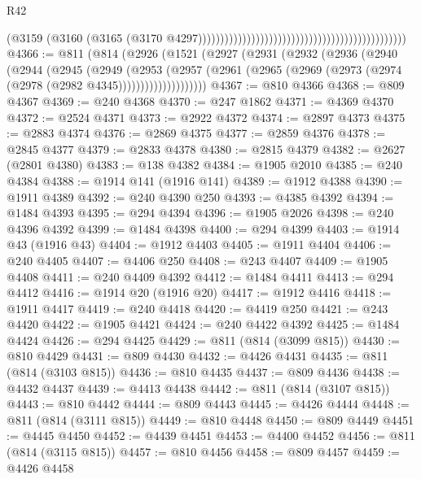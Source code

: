\begin{lexlean}{R42}
\begin{coremodule}
{                                                                                          (@3159
                                                                                            (@3160
                                                                                              (@3165
                                                                                                (@3170
                                                                                                  @4297)))))))))))))))))))))))))))))))))))))))))))))))
@4366 := @811
    (@814
      (@2926
        (@1521
          (@2927
            (@2931
              (@2932
                (@2936
                  (@2940
                    (@2944
                      (@2945
                        (@2949
                          (@2953
                            (@2957
                              (@2961
                                (@2965 (@2969 (@2973 (@2974 (@2978 (@2982 @4345))))))))))))))))))))
@4367 := @810 @4366
@4368 := @809 @4367
@4369 := @240 @4368
@4370 := @247 @1862
@4371 := @4369 @4370
@4372 := @2524 @4371
@4373 := @2922 @4372
@4374 := @2897 @4373
@4375 := @2883 @4374
@4376 := @2869 @4375
@4377 := @2859 @4376
@4378 := @2845 @4377
@4379 := @2833 @4378
@4380 := @2815 @4379
@4382 := @2627 (@2801 @4380)
@4383 := @138 @4382
@4384 := @1905 @2010
@4385 := @240 @4384
@4388 := @1914 @141 (@1916 @141)
@4389 := @1912 @4388
@4390 := @1911 @4389
@4392 := @240 @4390 @250
@4393 := @4385 @4392
@4394 := @1484 @4393
@4395 := @294 @4394
@4396 := @1905 @2026
@4398 := @240 @4396 @4392
@4399 := @1484 @4398
@4400 := @294 @4399
@4403 := @1914 @43 (@1916 @43)
@4404 := @1912 @4403
@4405 := @1911 @4404
@4406 := @240 @4405
@4407 := @4406 @250
@4408 := @243 @4407
@4409 := @1905 @4408
@4411 := @240 @4409 @4392
@4412 := @1484 @4411
@4413 := @294 @4412
@4416 := @1914 @20 (@1916 @20)
@4417 := @1912 @4416
@4418 := @1911 @4417
@4419 := @240 @4418
@4420 := @4419 @250
@4421 := @243 @4420
@4422 := @1905 @4421
@4424 := @240 @4422 @4392
@4425 := @1484 @4424
@4426 := @294 @4425
@4429 := @811 (@814 (@3099 @815))
@4430 := @810 @4429
@4431 := @809 @4430
@4432 := @4426 @4431
@4435 := @811 (@814 (@3103 @815))
@4436 := @810 @4435
@4437 := @809 @4436
@4438 := @4432 @4437
@4439 := @4413 @4438
@4442 := @811 (@814 (@3107 @815))
@4443 := @810 @4442
@4444 := @809 @4443
@4445 := @4426 @4444
@4448 := @811 (@814 (@3111 @815))
@4449 := @810 @4448
@4450 := @809 @4449
@4451 := @4445 @4450
@4452 := @4439 @4451
@4453 := @4400 @4452
@4456 := @811 (@814 (@3115 @815))
@4457 := @810 @4456
@4458 := @809 @4457
@4459 := @4426 @4458
}
\end{coremodule}
\end{lexlean}

